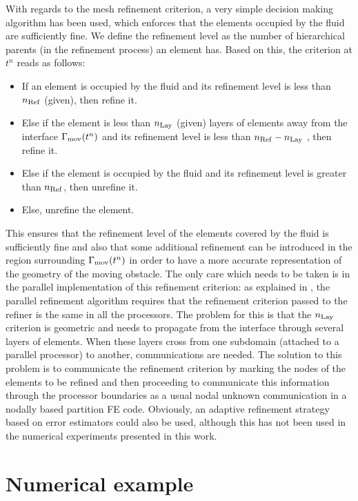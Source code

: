 \documentclass[11pt,a4paper,oneside,reqno]{amsart}
\begin{document}
With regards to the mesh refinement criterion, a very simple decision
making algorithm has been used, which enforces that the elements occupied
by the fluid are sufficiently fine. We define the refinement level
as the number of hierarchical parents (in the refinement process)
an element has. Based on this, the criterion at $t^n$ reads as follows:
\begin{itemize}
\item If an element is occupied by the fluid and its refinement level is
less than\textit{ $n_{{\rm Ref}}$} (given), then refine it.
\item Else if the element is less than $n_{{\rm Lay}}$ (given) layers of elements
away from the interface $\Gamma_{\rm mov}(t^n)$ and its refinement level is less
than $n_{{\rm Ref}} - n_{{\rm Lay}}$ , then refine it.
\item Else if the element is occupied by the fluid and its refinement level
is greater than\textit{ $n_{{\rm Ref}}$}, then unrefine it.
\item Else, unrefine the element. 
\end{itemize}
This ensures that the refinement level of the elements covered by
the fluid is sufficiently fine and also that some additional refinement
can be introduced in the region surrounding $\Gamma_{\rm mov}(t^n)$ in order to
have a more accurate representation of the geometry of the moving
obstacle. The only care which needs to be taken is in the parallel
implementation of this refinement criterion: as explained in \cite{baiges:siam_jsc17},
the parallel refinement algorithm requires that the refinement criterion
passed to the refiner is the same in all the processors. The problem
for this is that the $n_{{\rm Lay}}$ criterion is geometric and needs
to propagate from the interface through several layers of elements.
When these layers cross from one subdomain (attached to a parallel
processor) to another, communications are needed. The solution to
this problem is to communicate the refinement criterion by marking
the nodes of the elements to be refined and then proceeding to communicate
this information through the processor boundaries as a usual nodal
unknown communication in a nodally based partition FE
code. Obviously, an adaptive refinement strategy based on error estimators
could also be used, although this has not been used in the numerical
experiments presented in this work.

\section{Numerical example}\label{sec:numex}
\end{document}

